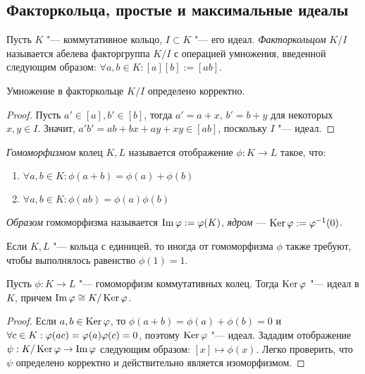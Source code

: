 \subsection{Факторкольца, простые и максимальные идеалы}

\begin{definition}
	Пусть $K$ "--- коммутативное кольцо, $I \subset K$ "--- его идеал. \textit{Факторкольцом} $K / I$ называется абелева факторгруппа $K / I$ с операцией умножения, введенной следующим образом: $\forall a, b \in K: [a][b] := [ab]$.
\end{definition}

\begin{proposition}
	Умножение в факторкольце $K / I$ определено корректно.
\end{proposition}

\begin{proof}
	Пусть $a' \in [a], b' \in [b]$, тогда $a' = a + x$, $b' = b + y$ для некоторых $x, y \in I$. Значит, $a'b' = ab + bx + ay + xy \in [ab]$, поскольку $I$ "--- идеал.
\end{proof}

\begin{definition}
	\textit{Гомоморфизмом} колец $K, L$ называется отображение $\phi: K \to L$ такое, что:
	\begin{enumerate}
		\item $\forall a, b \in K: \phi(a + b) = \phi(a) + \phi(b)$
		\item $\forall a, b \in K: \phi(ab) = \phi(a)\phi(b)$
	\end{enumerate}

	\textit{Образом} гомоморфизма называется $\operatorname{Im}\varphi := \varphi(K)$, \textit{ядром} --- $\operatorname{Ker}\varphi := \varphi^{-1}(0)$.
\end{definition}

\begin{note}
	Если $K, L$ "--- кольца с единицей, то иногда от гомоморфизма $\phi$ также требуют, чтобы выполнялось равенство $\phi(1) = 1$.
\end{note}

\begin{theorem}
	Пусть $\phi : K \to L$ "--- гомоморфизм коммутативных колец. Тогда $\operatorname{Ker}\varphi$ "--- идеал в $K$, причем $\operatorname{Im}\varphi \cong K / \operatorname{Ker}{\varphi}$.
\end{theorem}

\begin{proof}
	Если $a, b \in \operatorname{Ker}\varphi$, то $\phi(a + b) = \phi(a) + \phi(b) = 0$ и $\forall c \in K: \phi(ac) \hm= \phi(a)\phi(c) = 0$, поэтому $\operatorname{Ker}\varphi$ "--- идеал. Зададим отображение $\psi: K/\operatorname{Ker}\varphi \to \operatorname{Im}\varphi$ следующим образом: $[x] \mapsto \phi(x)$. Легко проверить, что $\psi$ определено корректно и действительно является изоморфизмом.
\end{proof}


